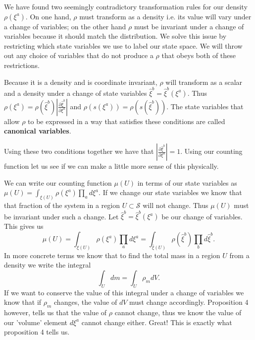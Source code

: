 \documentclass{article}[a4paper]
\begin{document}

	We have found two seemingly contradictory transformation rules for our density $\rho(\xi^a)$. On one hand, $\rho$ must transform as a density i.e. its value will vary under a change of variables; on the other hand $\rho$ must be invariant under a change of variables because it should match the distribution. We solve this issue by restricting which state variables we use to label our state space. We will throw out any choice of variables that do not produce a $\rho$ that obeys both of these restrictions.
	

\begin{prop}
	Because it is a density and is coordinate invariant, $\rho$ will transform as a scalar and a density under a change of state variables $\hat{\xi}^b = \hat{\xi}^b(\xi^a)$. Thus $\rho(\xi^a) = \rho(\hat{\xi}^b)\left|\frac{\partial\hat{\xi}^b}{\partial\xi^a}\right|$ and $\rho(s(\xi^a)) = \rho(s(\hat{\xi}^b))$. The state variables that allow $\rho$ to be expressed in a way that satisfies these conditions are called \textbf{canonical variables}.
\end{prop}

	
	Using these two conditions together we have that $\left|\frac{\partial\hat{\xi}^b}{\partial\xi^a}\right| = 1$. Using our counting function let us see if we can make a little more sense of this physically.

	We can write our counting function $\mu(U)$ in terms of our state variables as $\mu(U) = \int_{\xi(U)} \rho(\xi^a) \prod_a d\xi^a$. If we change our state variables we know that that fraction of the system in a region $U \subset \mathcal{S}$ will not change. Thus $\mu(U)$ must be invariant under such a change. Let $\hat{\xi}^b = \hat{\xi}^b(\xi^a)$ be our change of variables. This gives us $$\mu(U) = \int_{\xi(U)} \rho(\xi^a) \prod_a d\xi^a = \int_{\hat{\xi}(U)} \rho(\hat{\xi}^b) \prod_b d\hat{\xi}^b.$$ 
	In more concrete terms we know that to find the total mass in a region $U$ from a density we write the integral $$\int_{U} dm = \int_{U} \rho_m dV.$$ If we want to conserve the value of this integral under a change of variables we know that if $\rho_m$ changes, the value of $dV$ must change accordingly. Proposition 4 however, tells us that the value of $\rho$ cannot change, thus we know the value of our 'volume' element $d\xi^a$ cannot change either. Great! This is exactly what proposition 4 tells us. 
	
\end{document}
